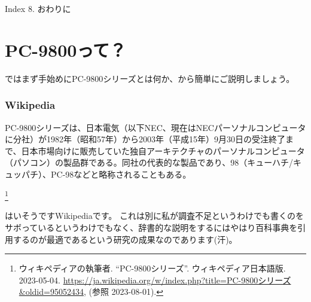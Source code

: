 \documentclass[b5paper,9pt]{jsarticle}
\begin{document}
\begin{multicols*}{3}
\begin{itembox}[l]{Index}
  8. おわりに
  \end{itembox}
\part{PC-9800って？}
ではまず手始めにPC-9800シリーズとは何か、から簡単にご説明しましょう。
\section[short]{Wikipedia}
\begin{screen}
PC-9800シリーズは、日本電気（以下NEC、現在はNECパーソナルコンピュータに分社）が1982年（昭和57年）から2003年（平成15年）9月30日の受注終了まで、日本市場向けに販売していた独自アーキテクチャのパーソナルコンピュータ（パソコン）の製品群である。同社の代表的な製品であり、98（キューハチ/キュッパチ）、PC-98などと略称されることもある。
\end{screen}
\footnote{ウィキペディアの執筆者. “PC-9800シリーズ”. ウィキペディア日本語版. 2023-05-04. \url{https://ja.wikipedia.org/w/index.php?title=PC-9800シリーズ&oldid=95052434}, (参照 2023-08-01).}
\\
\\
はいそうですWikipediaです。
これは別に私が調査不足というわけでも書くのをサボっているというわけでもなく、辞書的な説明をするにはやはり百科事典を引用するのが最適であるという研究の成果なのであります(汗)。
\end{multicols*}
\end{document}

